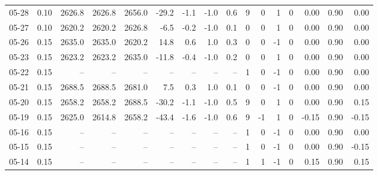 \begin{threeparttable}
{\begin{tabular}{lrrrrrrrrrrrrrrr}
  05-28 &     0.10 & 2626.8 & 2626.8 & 2656.0 &      -29.2 &           -1.1 &                     -1.0 &                 0.6 &              9 &         0 &     1 &         0 &       0.00 &      0.90 &           0.00 \\
  05-27 &     0.10 & 2620.2 & 2620.2 & 2626.8 &       -6.5 &           -0.2 &                     -1.0 &                 0.1 &              0 &         0 &     1 &         0 &       0.00 &      0.90 &           0.00 \\
  05-26 &     0.15 & 2635.0 & 2635.0 & 2620.2 &       14.8 &            0.6 &                      1.0 &                 0.3 &              0 &         0 &    -1 &         0 &       0.00 &      0.90 &           0.00 \\
  05-23 &     0.15 & 2623.2 & 2623.2 & 2635.0 &      -11.8 &           -0.4 &                     -1.0 &                 0.2 &              0 &         0 &     1 &         0 &       0.00 &      0.90 &           0.00 \\
  05-22 &     0.15 &     -- &     -- &     -- &         -- &             -- &                       -- &                  -- &              1 &         0 &    -1 &         0 &       0.00 &      0.90 &           0.00 \\
  05-21 &     0.15 & 2688.5 & 2688.5 & 2681.0 &        7.5 &            0.3 &                      1.0 &                 0.1 &              0 &         0 &    -1 &         0 &       0.00 &      0.90 &           0.00 \\
  05-20 &     0.15 & 2658.2 & 2658.2 & 2688.5 &      -30.2 &           -1.1 &                     -1.0 &                 0.5 &              9 &         0 &     1 &         0 &       0.00 &      0.90 &           0.15 \\
  05-19 &     0.15 & 2625.0 & 2614.8 & 2658.2 &      -43.4 &           -1.6 &                     -1.0 &                 0.6 &              9 &        -1 &     1 &         0 &      -0.15 &      0.90 &          -0.15 \\
  05-16 &     0.15 &     -- &     -- &     -- &         -- &             -- &                       -- &                  -- &              1 &         0 &    -1 &         0 &       0.00 &      0.90 &           0.00 \\
  05-15 &     0.15 &     -- &     -- &     -- &         -- &             -- &                       -- &                  -- &              1 &         0 &    -1 &         0 &       0.00 &      0.90 &          -0.15 \\
  05-14 &     0.15 &     -- &     -- &     -- &         -- &             -- &                       -- &                  -- &              1 &         1 &    -1 &         0 &       0.15 &      0.90 &           0.15 \\

\end{tabular}}
\end{threeparttable}
